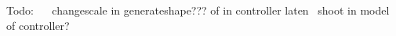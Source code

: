 Todo\+:~\newline
~\newline
 changescale in generateshape??? of in controller laten~\newline
 shoot in model of controller? 
